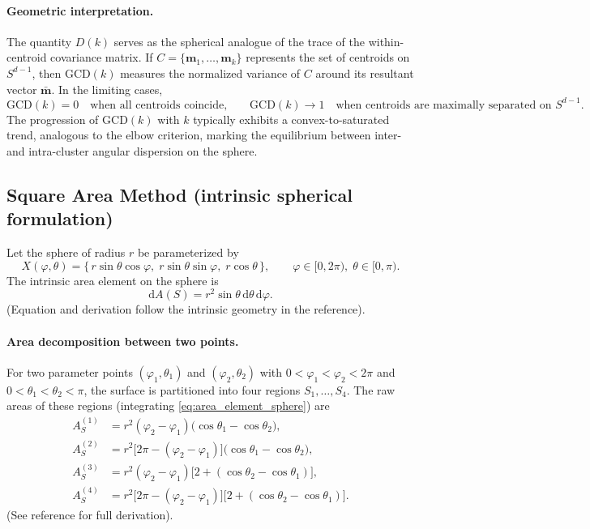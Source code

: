\documentclass[12pt,a4paper]{report}
\begin{document}
\paragraph{Geometric interpretation.}
The quantity $D(k)$ serves as the spherical analogue of the trace of the within-centroid covariance matrix.  
If $C=\{\mathbf{m}_1,\dots,\mathbf{m}_k\}$ represents the set of centroids on $S^{d-1}$, then $\mathrm{GCD}(k)$ measures the normalized variance of $C$ around its resultant vector $\bar{\mathbf{m}}$.  
In the limiting cases,
\[
\mathrm{GCD}(k)=0 \quad \text{when all centroids coincide,}
\qquad
\mathrm{GCD}(k)\to1 \quad \text{when centroids are maximally separated on } S^{d-1}.
\]
The progression of $\mathrm{GCD}(k)$ with $k$ typically exhibits a convex-to-saturated trend, analogous to the elbow criterion, marking the equilibrium between inter- and intra-cluster angular dispersion on the sphere.

\subsection{Square Area Method (intrinsic spherical formulation)}
Let the sphere of radius $r$ be parameterized by
\begin{equation}
X(\varphi,\theta) = \{\, r\sin\theta\cos\varphi,\; r\sin\theta\sin\varphi,\; r\cos\theta \,\},\qquad
\varphi\in[0,2\pi),\; \theta\in[0,\pi).
\end{equation}
The intrinsic area element on the sphere is
\begin{equation}
\mathrm{d}A(S)=r^{2}\sin\theta\,\mathrm{d}\theta\,\mathrm{d}\varphi. \label{eq:area_element_sphere}
\end{equation}
(Equation and derivation follow the intrinsic geometry in the reference). 

\paragraph{Area decomposition between two points.}
For two parameter points $(\varphi_1,\theta_1)$ and $(\varphi_2,\theta_2)$ with
$0<\varphi_1<\varphi_2<2\pi$ and $0<\theta_1<\theta_2<\pi$, the surface is partitioned into four regions $S_1,\dots,S_4$.
The raw areas of these regions (integrating \eqref{eq:area_element_sphere}) are
\begin{align}
A_S^{(1)} &= r^{2}(\varphi_2-\varphi_1)\big(\cos\theta_1-\cos\theta_2\big), \label{eq:AS1}\\
A_S^{(2)} &= r^{2}\big[2\pi-(\varphi_2-\varphi_1)\big]\big(\cos\theta_1-\cos\theta_2\big),\label{eq:AS2}\\
A_S^{(3)} &= r^{2}(\varphi_2-\varphi_1)\big[2 + (\cos\theta_2-\cos\theta_1)\big],\label{eq:AS3}\\
A_S^{(4)} &= r^{2}\big[2\pi-(\varphi_2-\varphi_1)\big]\big[2 + (\cos\theta_2-\cos\theta_1)\big].\label{eq:AS4}
\end{align}
(See reference for full derivation). 
\end{document}
